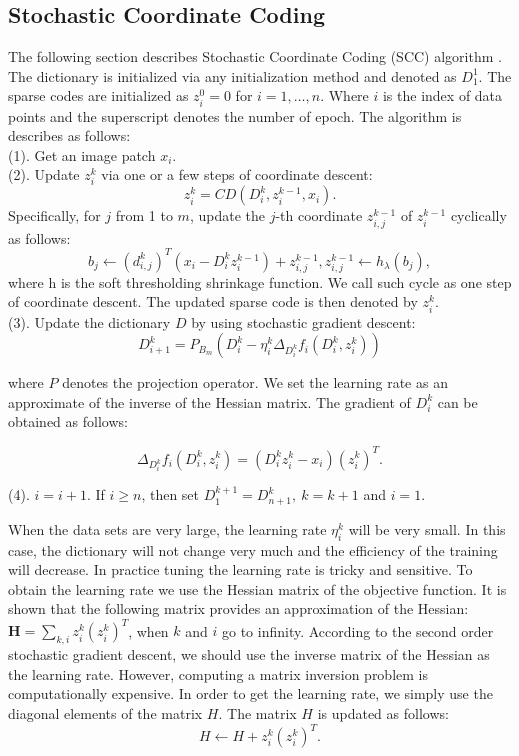 \documentclass[authoryear,preprint,revi	ew,12pt]{elsarticle}
\begin{document}
\subsection{\textbf{Stochastic Coordinate Coding}}
\label{app:SCC}
The following section describes Stochastic Coordinate Coding (SCC) algorithm \citep{lin2014stochastic}. The dictionary is initialized via any initialization method and denoted as $ D_1^1 $. The sparse codes are initialized as $ z_i^0 = 0 $ for $ i=1,\dots,n $. Where $ i $ is the index of data points and the superscript denotes the number of epoch. The algorithm is describes as follows:\\
(1). Get an image patch $ x_i $.\\
(2). Update $ z_i^k $ via one or a few steps of coordinate descent: 
\begin{equation}
z^k_i = CD(D^k_i,z^{k-1}_i,x_i).
\end{equation}
Specifically, for $ j $ from 1 to $ m $, update the $ j $-th coordinate $ z_{i,j}^{k-1} $ of $ z_{i}^{k-1} $ cyclically as follows:
\begin{equation}
b_j \gets (d_{i,j}^k)^T (x_i - D_i^kz^{k-1}_i) + z^{k-1}_{i,j}, z_{i,j}^{k-1} \gets h_{\lambda}(b_j),
\end{equation}	
where h is the soft thresholding shrinkage function. We call such cycle as one step of coordinate descent. The updated sparse code is then denoted by $ z_i^k $. \\
(3). Update the dictionary $ D $ by using stochastic gradient descent:
\begin{equation}
D_{i+1}^k = P_{B_m}(D_i^k - \eta^k_i\Delta_{D_i^k} f_i(D_i^k,z^k_i))
\end{equation}

where $ P $ denotes the projection operator. We set the learning rate as an approximate of the inverse of the Hessian matrix. The gradient of $ D_i^k $ can be obtained as follows:

\begin{equation}
\Delta_{D_i^k} f_i (D_i^k, z_i^k) = (D^k_iz^k_i - x_i)(z^k_i)^T.
\end{equation}

(4). $ i = i+1 $. If $ i \ge n $, then set $ D_1^{k+1} = D^k_{n+1}, ~k=k+1$ and $ i = 1 $.

When the data sets are very large, the learning rate $ \eta^k_i $ will be very small. In this case, the dictionary will not change very much and the efficiency of the training will decrease. In practice tuning the learning rate is tricky and sensitive. To obtain the learning rate we use the Hessian matrix of the objective function. It is shown that the following matrix provides an approximation of the Hessian: $ \mathbf{H} = \sum_{k,i} z^k_i(z^k_i)^T $, when $ k $ and $ i $ go to infinity. According to the second order stochastic gradient descent, we should use the inverse matrix of the Hessian as the learning rate. However, computing a matrix inversion problem is computationally expensive. In order to get the learning rate, we simply use the diagonal elements of the matrix $ H $. The matrix $ H $ is updated as follows:
\begin{equation}
	H \gets H + z^k_i(z^k_i)^T.
\end{equation}
\end{document}
